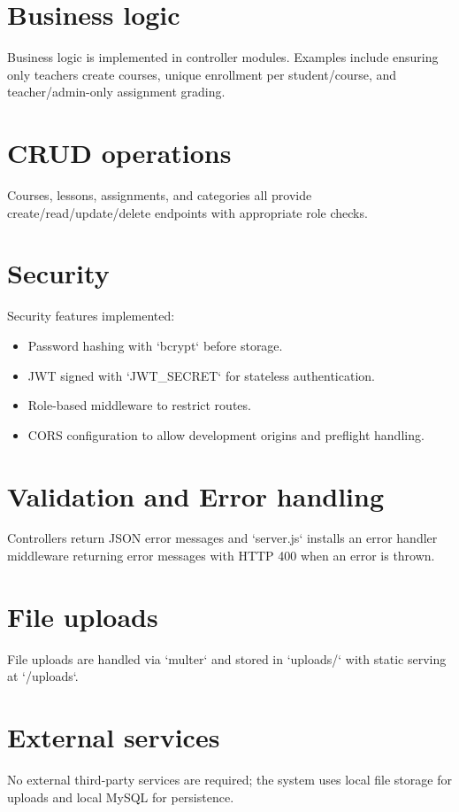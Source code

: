 \documentclass[12pt,a4paper]{report}
\begin{document}
\section{Business logic}
Business logic is implemented in controller modules. Examples include ensuring only teachers create courses, unique enrollment per student/course, and teacher/admin-only assignment grading.

\section{CRUD operations}
Courses, lessons, assignments, and categories all provide create/read/update/delete endpoints with appropriate role checks.

\section{Security}
Security features implemented:
\begin{itemize}
  \item Password hashing with `bcrypt` before storage.
  \item JWT signed with `JWT_SECRET` for stateless authentication.
  \item Role-based middleware to restrict routes.
  \item CORS configuration to allow development origins and preflight handling.
\end{itemize}

\section{Validation and Error handling}
Controllers return JSON error messages and `server.js` installs an error handler middleware returning error messages with HTTP 400 when an error is thrown.

\section{File uploads}
File uploads are handled via `multer` and stored in `uploads/` with static serving at `/uploads`.

\section{External services}
No external third-party services are required; the system uses local file storage for uploads and local MySQL for persistence.
\end{document}
